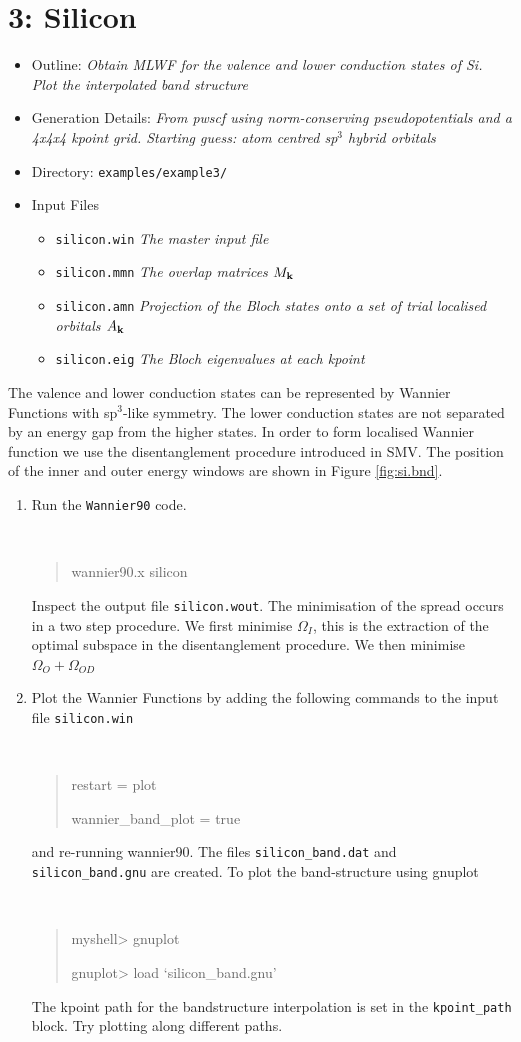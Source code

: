 \documentclass[a4paper,11pt,twoside]{article}
\begin{document}
\cleardoublepage


\section*{3: Silicon}

\begin{itemize}
\item{Outline: \it{Obtain MLWF for the valence and lower conduction states of Si. Plot the interpolated band structure}}
\item{Generation Details: \it{From pwscf using norm-conserving pseudopotentials
and a 4x4x4 kpoint grid. Starting guess:  atom centred sp$^3$ hybrid orbitals}}
\item{Directory: {\tt examples/example3/}}
\item{Input Files}
\begin{itemize}
\item{ {\tt silicon.win}  {\it The master input file}}
\item{ {\tt silicon.mmn}  {\it The overlap matrices $M_{{\bf k}}$}}
\item{ {\tt silicon.amn}  {\it Projection of the Bloch states onto a set of trial localised orbitals $A_{{\bf k}}$}}
\item{ {\tt silicon.eig}  {\it The Bloch eigenvalues at each kpoint}}
\end{itemize}
\end{itemize}
The valence and lower conduction states can be represented by Wannier Functions with sp$^3$-like symmetry. The lower conduction states are not separated by an energy gap from the higher states. In order to form localised Wannier function we use the disentanglement procedure introduced in SMV. The position of the inner and outer energy windows are shown in Figure \ref{fig:si.bnd}.
\begin{enumerate}
\item Run the {\tt Wannier90} code.
{\tt
\begin{quote}
wannier90.x silicon
\end{quote} }
Inspect the output file {\tt silicon.wout}. The minimisation of the spread occurs in a two step procedure. We first minimise $\Omega_I$, this is the extraction of the optimal subspace in the disentanglement procedure. We then minimise $\Omega_O+\Omega_{OD}$


\item Plot the Wannier Functions by adding the following commands to the input file {\tt silicon.win}
{\tt
\begin{quote}
restart = plot

wannier\_band\_plot = true
\end{quote} }
and re-running wannier90. The files {\tt silicon\_band.dat} and {\tt silicon\_band.gnu} are created.
To plot the band-structure using gnuplot
\smallskip
{\tt
\begin{quote}
myshell> gnuplot

gnuplot> load `silicon\_band.gnu'
\end{quote} }
The kpoint path for the bandstructure interpolation is set in the {\tt kpoint\_path} block. Try plotting along different paths.
\end{enumerate}
\end{document}
